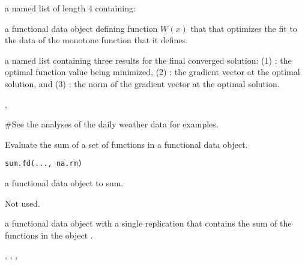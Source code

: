 \documentclass{article}
\begin{document}
\begin{Value}
a named list of length 4 containing:

\begin{ldescription}
\item[\code{Wfdobj}] a functional data object defining function $W(x)$ that that
optimizes the fit to the data of the monotone function that it
defines.

\item[\code{Flist}] a named list containing three results for the final converged
solution: (1) : the optimal function value being minimized,
(2) : the gradient vector at the optimal solution, and
(3) : the norm of the gradient vector at the optimal
solution.

\end{ldescription}
\end{Value}
\begin{SeeAlso}\relax
{},
\end{SeeAlso}
\begin{Examples}
\begin{ExampleCode}
#See the analyses of the daily weather data for examples.
\end{ExampleCode}
\end{Examples}

\begin{Description}\relax
Evaluate the sum of a set of functions in a functional data object.
\end{Description}
\begin{Usage}
\begin{verbatim}
sum.fd(..., na.rm)
\end{verbatim}
\end{Usage}
\begin{Arguments}
\begin{ldescription}
\item[\code{...}] a functional data object to sum.

\item[\code{na.rm}] Not used.
\end{ldescription}
\end{Arguments}
\begin{Value}
a functional data object with a single replication
that contains the sum of the functions in the object .
\end{Value}
\begin{SeeAlso}\relax
{}, 
, 
, 
\end{SeeAlso}
\end{document}
